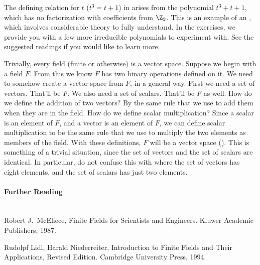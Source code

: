%
The defining relation for $t$ ($t^3=t+1$) in    arises from the polynomial $t^3+t+1$, which has no factorization with coefficients from $\Z_2$.  This is an example of an , which involves considerable theory to fully understand.  In the exercises, we provide you with a few more irreducible polynomials to experiment with.  See the suggested readings if you would like to learn more.\par
%
Trivially, every field (finite or otherwise) is a vector space.  Suppose we begin with a field $F$.  From this we know $F$ has two binary operations defined on it.  We need to somehow create a vector space from $F$, in a general way.  First we need a set of vectors.  That'll be $F$.  We also need a set of scalars.  That'll be $F$ as well.  How do we define the addition of two vectors?  By the same rule that we use to add them when they are in the field.  How do we define scalar multiplication?  Since a scalar is an element of $F$, and a vector is an element of $F$, we can define scalar multiplication to be the same rule that we use to multiply the two elements as members of the field.  With these definitions, $F$ will be a vector space ().  This is something of a trivial situation, since the set of vectors and the set of scalars are identical.  In particular, do not confuse this with  where the set of vectors has eight elements, and the set of scalars has just two elements.
%
\paragraph{Further Reading}\ \\
%
Robert J.\ McEliece, Finite Fields for Scientists and Engineers. Kluwer Academic Publishers, 1987.\par
%
Rudolpf Lidl, Harald Niederreiter, Introduction to Finite Fields and Their Applications, Revised Edition.  Cambridge University Press, 1994.
%
%




